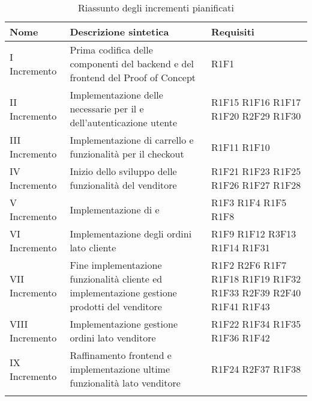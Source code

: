 \begin{center}
	\begin{longtable}{|p{2.5cm}|p{6.5cm}|p{6cm}|}
		\hline
		\rowcolor{lighter-grayer}
		\textbf{Nome}  & \textbf{Descrizione sintetica}                                                & \textbf{Requisiti} \\
		\hline
		\endfirsthead
		\hline
		\hline
		\endfoot
		\endlastfoot
		\hline
		I Incremento   & Prima codifica delle componenti del backend e del frontend del Proof of Concept & R1F1 \\
		II Incremento  & Implementazione delle \glock{API} necessarie per il \glock{PoC} e dell'autenticazione utente & R1F15 R1F16 R1F17 R1F20 R2F29 R1F30 \\
		III Incremento & Implementazione di carrello e funzionalità per il checkout   & R1F11 R1F10 \\
		IV Incremento  & Inizio dello sviluppo delle funzionalità del venditore & R1F21 R1F23 R1F25 R1F26 R1F27 R1F28          \\
		V Incremento   & Implementazione di \glock{PLP} e \glock{PDP}  & R1F3 R1F4 R1F5 R1F8 \\
		VI Incremento   & Implementazione degli ordini lato cliente   & R1F9 R1F12 R3F13 R1F14 R1F31 \\
		VII Incremento   & Fine implementazione funzionalità cliente ed implementazione gestione prodotti del venditore     &  R1F2 R2F6 R1F7 R1F18 R1F19 R1F32 R1F33 R2F39 R2F40 R1F41 R1F43\\
		VIII Incremento   & Implementazione gestione ordini lato venditore & R1F22 R1F34 R1F35 R1F36 R1F42 \\
		IX Incremento   & Raffinamento frontend e implementazione ultime funzionalità lato venditore & R1F24  R2F37 R1F38  \\
		
		 \hline
		\rowcolor{white}
		\caption{Riassunto degli incrementi pianificati}
	\end{longtable}
\end{center}